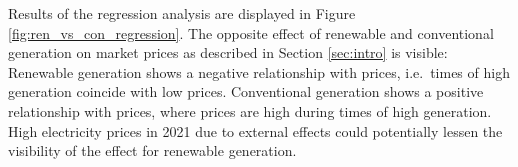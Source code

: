\documentclass{article}
\begin{document}
Results of the regression analysis are displayed in Figure \ref{fig:ren_vs_con_regression}.
The opposite effect of renewable and conventional generation on market prices as described in Section \ref{sec:intro} is visible:
Renewable generation shows a negative relationship with prices, i.e.\ times of high generation coincide with low prices.
Conventional generation shows a positive relationship with prices, where prices are high during times of high generation.
High electricity prices in 2021 due to external effects could potentially lessen the visibility of the effect for renewable generation.


\end{document}
